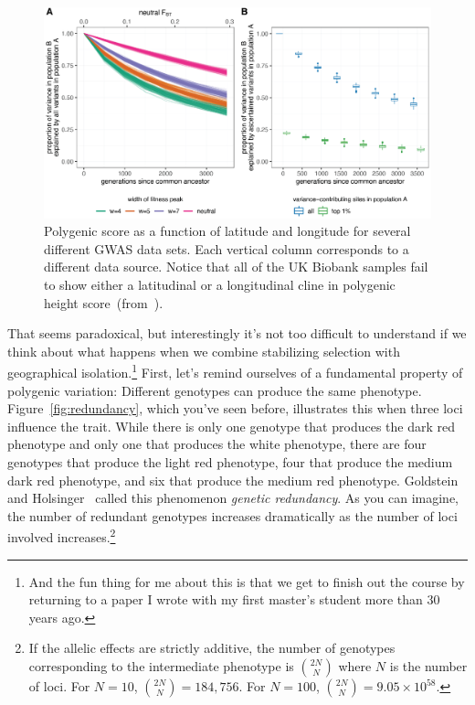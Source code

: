\documentclass[12pt]{article}
\begin{document}
\begin{figure}
  \begin{center}
    \includegraphics[width=\textwidth]{yair-coop-predictions.eps}
  \end{center}
  \caption{Polygenic score as a function of latitude and longitude for
    several different GWAS data sets. Each vertical column corresponds
  to a different data source. Notice that all of the UK Biobank
  samples fail to show either a latitudinal or a longitudinal cline in
  polygenic height score~(from~\cite{Yair-Coop-2021}).}\label{fig:UK-biobank} 
\end{figure}

That seems paradoxical, but interestingly it's not too difficult to
understand if we think about what happens when we combine stabilizing
selection with geographical isolation.\footnote{And the fun thing for
  me about this is that we get to finish out the course by returning
  to a paper I wrote with my first master's student more than 30 years
  ago.} First, let's remind ourselves of a fundamental property of
polygenic variation: Different genotypes can produce the same
phenotype. Figure~\ref{fig:redundancy}, which you've seen before,
illustrates this when three loci influence the trait. While there is
only one genotype that produces the dark red phenotype and only one
that produces the white phenotype, there are four genotypes that
produce the light red phenotype, four that produce the medium dark red
phenotype, and six that produce the medium red phenotype. Goldstein
and Holsinger~\cite{Goldstein-Holsinger-1992} called this phenomenon
{\it genetic redundancy}. As you can
imagine, the number of redundant genotypes increases dramatically as
the number of loci involved increases.\footnote{If the allelic effects
  are strictly additive, the number of genotypes corresponding to the
  intermediate phenotype is $2N \choose N$ where $N$ is the number of
  loci. For $N=10$, ${2N \choose N} = 184,756$. For $N=100$, ${2N \choose
  N} = 9.05 \times 10^{58}$.}
\end{document}
